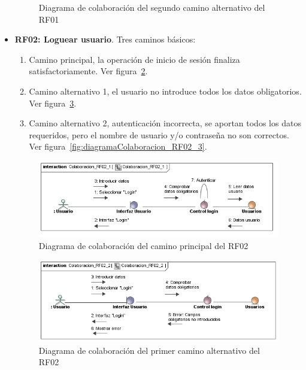 \begin{itemize}
\begin{figure} [!htb]
		\caption{Diagrama de colaboración del segundo camino alternativo del RF01}
		\label{fig:diagramaColaboracion_RF01_3}
	\end{figure}
	
	\FloatBarrier
	\item \textbf{RF02: Loguear usuario}. Tres caminos básicos: 
	\begin{enumerate}
		\item Camino principal, la operación de inicio de sesión finaliza satisfactoriamente. Ver figura~\ref{fig:diagramaColaboracion_RF02_1}.
		\item Camino alternativo 1, el usuario no introduce todos los datos obligatorios. Ver figura~\ref{fig:diagramaColaboracion_RF02_2}.
		\item Camino alternativo 2, autenticación incorrecta, se aportan todos los datos requeridos, pero el nombre de usuario y/o contraseña no son correctos. Ver figura~\ref{fig:diagramaColaboracion_RF02_3}.
	\end{enumerate}
	\begin{figure} [!htb]
		\centering
		\includegraphics[width=\linewidth,height=\textheight,keepaspectratio]{Images/Diagramas/04_Colaboracion_RF02_1}
		\caption{Diagrama de colaboración del camino principal del RF02}
		\label{fig:diagramaColaboracion_RF02_1}
	\end{figure}
	\begin{figure} [!htb]
		\centering
		\includegraphics[width=\linewidth,height=\textheight,keepaspectratio]{Images/Diagramas/04_Colaboracion_RF02_2}
		\caption{Diagrama de colaboración del primer camino alternativo del RF02}
		\label{fig:diagramaColaboracion_RF02_2}

\end{figure}
\end{itemize}
